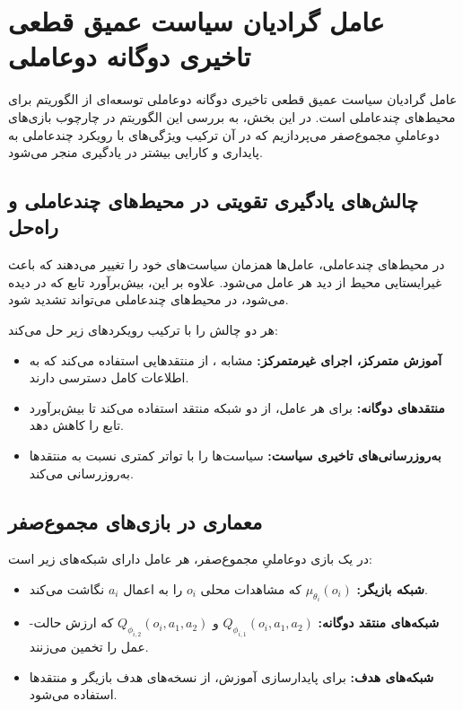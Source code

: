 \section{عامل گرادیان سیاست عمیق قطعی تاخیری دوگانه دو­عاملی}\label{sec:MATD3}

عامل گرادیان سیاست عمیق قطعی تاخیری دوگانه دو­عاملی
توسعه‌ای از الگوریتم  برای محیط‌های چند­عاملی است. در این بخش، به بررسی این الگوریتم در چارچوب بازی‌های دو­عاملیِ مجموع­‌صفر می‌پردازیم که در آن ترکیب ویژگی‌های  با رویکرد چند­عاملی  به پایداری و کارایی بیشتر در یادگیری منجر می‌شود.

\subsection{چالش‌های یادگیری تقویتی در محیط‌های چند­عاملی و راه‌حل }

در محیط‌های چند­عاملی، عامل‌ها همزمان سیاست‌های خود را تغییر می‌دهند که باعث غیرایستایی محیط از دید هر عامل می‌شود. علاوه بر این، بیش‌برآورد تابع  که در  دیده می‌شود، در محیط‌های چند­عاملی می‌تواند تشدید شود.

 هر دو چالش را با ترکیب رویکردهای زیر حل می‌کند:
\begin{itemize}
    \item \textbf{آموزش متمرکز، اجرای غیرمتمرکز:} مشابه ، از منتقدهایی استفاده می‌کند که به اطلاعات کامل دسترسی دارند.
    \item \textbf{منتقدهای دوگانه:} برای هر عامل، از دو شبکه منتقد استفاده می‌کند تا بیش‌برآورد تابع  را کاهش دهد.
    \item \textbf{به‌روزرسانی‌های تاخیری سیاست:} سیاست‌ها را با تواتر کمتری نسبت به منتقدها به‌روزرسانی می‌کند.
\end{itemize}

\subsection{معماری  در بازی‌های مجموع­‌صفر}

در یک بازی دو­عاملیِ مجموع­‌صفر، هر عامل دارای شبکه‌های زیر است:

\begin{itemize}
    \item \textbf{شبکه بازیگر:} $\mu_{\theta_i}(o_i)$ که مشاهدات محلی $o_i$ را به اعمال $a_i$ نگاشت می‌کند.
    \item \textbf{شبکه‌های منتقد دوگانه:} $Q_{\phi_{i,1}}(o_i, a_1, a_2)$ و $Q_{\phi_{i,2}}(o_i, a_1, a_2)$ که ارزش حالت-عمل را تخمین می‌زنند.
    \item \textbf{شبکه‌های هدف:} برای پایدارسازی آموزش، از نسخه‌های هدف بازیگر و منتقدها استفاده می‌شود.
\end{itemize}

